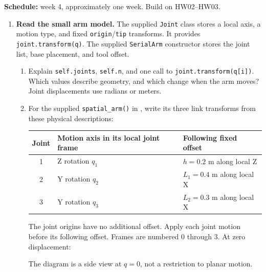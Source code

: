 

\textbf{Schedule:} week 4, approximately one week. Build on HW02--HW03.
\conventions

\begin{enumerate}
\item \textbf{Read the small arm model.}
The supplied \texttt{Joint} class stores a local axis, a motion type, and
fixed \texttt{origin}/\texttt{tip} transforms. It provides
\texttt{joint.transform(q)}. The supplied \texttt{SerialArm} constructor
stores the joint list, base placement, and tool offset.
\begin{enumerate}
\item Explain \texttt{self.joints}, \texttt{self.n}, and one call to
\texttt{joint.transform(q[i])}. Which values describe geometry, and which
change when the arm moves? Joint displacements use radians or meters.
\item For the supplied \texttt{spatial\_arm()} in ,
write its three link transforms from these physical descriptions:
\begin{center}
\begin{tabular}{cll}
Joint & Motion axis in its local joint frame & Following fixed offset \\
\hline
1 & Z rotation $q_1$ & $h=0.2$ m along local Z \\
2 & Y rotation $q_2$ & $L_1=0.4$ m along local X \\
3 & Y rotation $q_3$ & $L_2=0.3$ m along local X
\end{tabular}
\end{center}
The joint origins have no additional offset. Apply each joint motion before
its following offset. Frames are numbered 0 through 3. At zero displacement:
\begin{center}
\end{center}
The diagram is a side view at $q=0$, not a restriction to planar motion.
\end{enumerate}


\end{enumerate}
